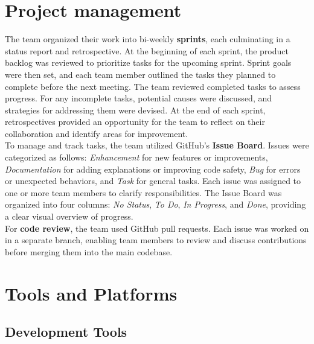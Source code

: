 \newpage

\section{Project management}
\label{sec:methods-project-management}

The team organized their work into bi-weekly \textbf{sprints}, each culminating in a status report and retrospective. At the beginning of each sprint, the product backlog was reviewed to prioritize tasks for the upcoming sprint. Sprint goals were then set, and each team member outlined the tasks they planned to complete before the next meeting. The team reviewed completed tasks to assess progress. For any incomplete tasks, potential causes were discussed, and strategies for addressing them were devised. At the end of each sprint, retrospectives provided an opportunity for the team to reflect on their collaboration and identify areas for improvement. \\

To manage and track tasks, the team utilized GitHub’s \textbf{Issue Board}. Issues were categorized as follows: \textit{Enhancement} for new features or improvements, \textit{Documentation} for adding explanations or improving code safety, \textit{Bug} for errors or unexpected behaviors, and \textit{Task} for general tasks. Each issue was assigned to one or more team members to clarify responsibilities. The Issue Board was organized into four columns: \textit{No Status}, \textit{To Do}, \textit{In Progress}, and \textit{Done}, providing a clear visual overview of progress. \\

For \textbf{code review}, the team used GitHub pull requests. Each issue was worked on in a separate branch, enabling team members to review and discuss contributions before merging them into the main codebase.

\section{Tools and Platforms}
\label{sec:tools-and-platforms}

\subsection*{Development Tools}
\label{subsec:development-tools}

